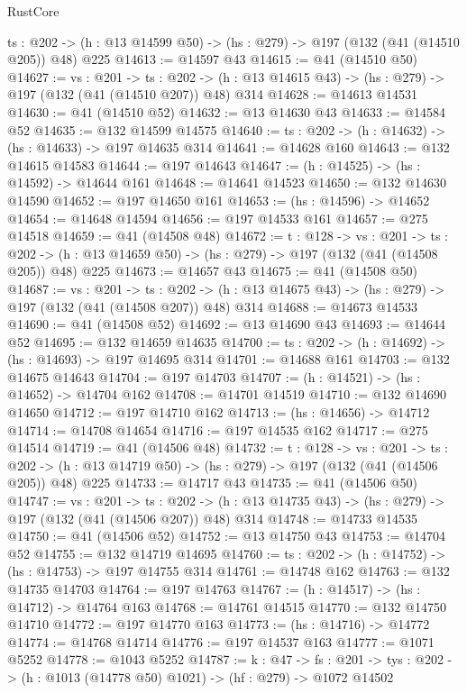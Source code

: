 \begin{lexlean}{RustCore}
\begin{coremodule}
  {ts : @202} -> (h : @13 @14599 @50) -> (hs : @279) -> @197 (@132 (@41 (@14510 @205)) @48) @225
@14613 := @14597 @43
@14615 := @41 (@14510 @50)
@14627 := {vs : @201} ->
  {ts : @202} -> (h : @13 @14615 @43) -> (hs : @279) -> @197 (@132 (@41 (@14510 @207)) @48) @314
@14628 := @14613 @14531
@14630 := @41 (@14510 @52)
@14632 := @13 @14630 @43
@14633 := @14584 @52
@14635 := @132 @14599 @14575
@14640 := {ts : @202} -> (h : @14632) -> (hs : @14633) -> @197 @14635 @314
@14641 := @14628 @160
@14643 := @132 @14615 @14583
@14644 := @197 @14643
@14647 := (h : @14525) -> (hs : @14592) -> @14644 @161
@14648 := @14641 @14523
@14650 := @132 @14630 @14590
@14652 := @197 @14650 @161
@14653 := (hs : @14596) -> @14652
@14654 := @14648 @14594
@14656 := @197 @14533 @161
@14657 := @275 @14518
@14659 := @41 (@14508 @48)
@14672 := {t : @128} ->
  {vs : @201} ->
  {ts : @202} -> (h : @13 @14659 @50) -> (hs : @279) -> @197 (@132 (@41 (@14508 @205)) @48) @225
@14673 := @14657 @43
@14675 := @41 (@14508 @50)
@14687 := {vs : @201} ->
  {ts : @202} -> (h : @13 @14675 @43) -> (hs : @279) -> @197 (@132 (@41 (@14508 @207)) @48) @314
@14688 := @14673 @14533
@14690 := @41 (@14508 @52)
@14692 := @13 @14690 @43
@14693 := @14644 @52
@14695 := @132 @14659 @14635
@14700 := {ts : @202} -> (h : @14692) -> (hs : @14693) -> @197 @14695 @314
@14701 := @14688 @161
@14703 := @132 @14675 @14643
@14704 := @197 @14703
@14707 := (h : @14521) -> (hs : @14652) -> @14704 @162
@14708 := @14701 @14519
@14710 := @132 @14690 @14650
@14712 := @197 @14710 @162
@14713 := (hs : @14656) -> @14712
@14714 := @14708 @14654
@14716 := @197 @14535 @162
@14717 := @275 @14514
@14719 := @41 (@14506 @48)
@14732 := {t : @128} ->
  {vs : @201} ->
  {ts : @202} -> (h : @13 @14719 @50) -> (hs : @279) -> @197 (@132 (@41 (@14506 @205)) @48) @225
@14733 := @14717 @43
@14735 := @41 (@14506 @50)
@14747 := {vs : @201} ->
  {ts : @202} -> (h : @13 @14735 @43) -> (hs : @279) -> @197 (@132 (@41 (@14506 @207)) @48) @314
@14748 := @14733 @14535
@14750 := @41 (@14506 @52)
@14752 := @13 @14750 @43
@14753 := @14704 @52
@14755 := @132 @14719 @14695
@14760 := {ts : @202} -> (h : @14752) -> (hs : @14753) -> @197 @14755 @314
@14761 := @14748 @162
@14763 := @132 @14735 @14703
@14764 := @197 @14763
@14767 := (h : @14517) -> (hs : @14712) -> @14764 @163
@14768 := @14761 @14515
@14770 := @132 @14750 @14710
@14772 := @197 @14770 @163
@14773 := (hs : @14716) -> @14772
@14774 := @14768 @14714
@14776 := @197 @14537 @163
@14777 := @1071 @5252
@14778 := @1043 @5252
@14787 := {k : @47} ->
  {fs : @201} -> {tys : @202} -> (h : @1013 (@14778 @50) @1021) -> (hf : @279) -> @1072 @14502

\end{coremodule}
\end{lexlean}

